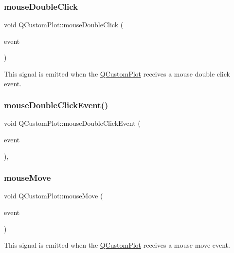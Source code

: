\subsubsection{\texorpdfstring{mouseDoubleClick}{mouseDoubleClick}}
{\footnotesize\ttfamily void Q\+Custom\+Plot\+::mouse\+Double\+Click (\begin{DoxyParamCaption}\item[{Q\+Mouse\+Event $\ast$}]{event }\end{DoxyParamCaption})\hspace{0.3cm}{\ttfamily [signal]}}

This signal is emitted when the \mbox{\hyperlink{class_q_custom_plot}{Q\+Custom\+Plot}} receives a mouse double click event. \mbox{\label{class_q_custom_plot_a344075e6e80ed6d575c79b81694abb8a}} 
\subsubsection{\texorpdfstring{mouseDoubleClickEvent()}{mouseDoubleClickEvent()}}
{\footnotesize\ttfamily void Q\+Custom\+Plot\+::mouse\+Double\+Click\+Event (\begin{DoxyParamCaption}\item[{Q\+Mouse\+Event $\ast$}]{event }\end{DoxyParamCaption})\hspace{0.3cm}{\ttfamily [protected]}, {\ttfamily [virtual]}}

\mbox{\label{class_q_custom_plot_a742ca4f94688bed2a685fd8a56ce5704}} 
\subsubsection{\texorpdfstring{mouseMove}{mouseMove}}
{\footnotesize\ttfamily void Q\+Custom\+Plot\+::mouse\+Move (\begin{DoxyParamCaption}\item[{Q\+Mouse\+Event $\ast$}]{event }\end{DoxyParamCaption})\hspace{0.3cm}{\ttfamily [signal]}}

This signal is emitted when the \mbox{\hyperlink{class_q_custom_plot}{Q\+Custom\+Plot}} receives a mouse move event.

